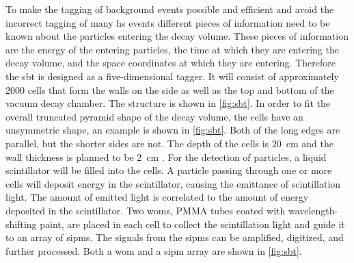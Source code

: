 To make the tagging of background events possible and efficient and avoid the incorrect tagging of many \ac{hs} events different pieces of information need to be known about the particles entering the decay volume.
These pieces of information are the energy of the entering particles, the time at which they are entering the decay volume, and the space coordinates at which they are entering.
Therefore the \ac{sbt} is designed as a five-dimensional tagger.
It will consist of approximately 2000 cells that form the walls on the side as well as the top and bottom of the vacuum decay chamber.
The structure is shown in \autoref{fig:sbt}.
In order to fit the overall truncated pyramid shape of the decay volume, the cells have an unsymmetric shape, an example is shown in \autoref{fig:sbt}.
Both of the long edges are parallel, but the shorter sides are not.
The depth of the cells is \SI{20}{\centi\meter} and the wall thickness is planned to be \SI{2}{\centi\meter} \cite{}.
For the detection of particles, a liquid scintillator will be filled into the cells.
A particle passing through one or more cells will deposit energy in the scintillator, causing the emittance of scintillation light.
The amount of emitted light is correlated to the amount of energy deposited in the scintillator.
Two \acp{wom}, PMMA tubes coated with wavelength-shifting paint, are placed in each cell to collect the scintillation light and guide it to an array of \acp{sipm}.
The signals from the \acp{sipm} can be amplified, digitized, and further processed.
Both a \ac{wom} and a \ac{sipm} array are shown in \autoref{fig:sbt}.
